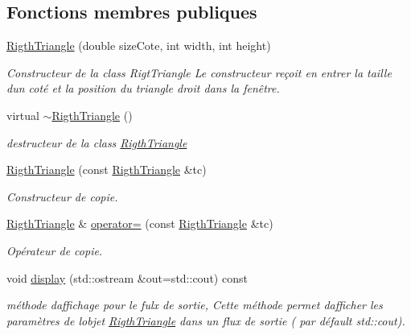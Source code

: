 \subsection*{Fonctions membres publiques}
\begin{DoxyCompactItemize}
\item 
\hyperlink{classgeometric_shape_1_1_rigth_triangle_ac705c9c12111aac3c0087164fa8d26d5}{Rigth\+Triangle} (double size\+Cote, int width, int height)
\begin{DoxyCompactList}\small\item\em Constructeur de la class Rigt\+Triangle Le constructeur reçoit en entrer la taille d\textquotesingle{}un coté et la position du triangle droit dans la fenêtre. \end{DoxyCompactList}\item 
\mbox{\label{classgeometric_shape_1_1_rigth_triangle_a3cad057825bf4f1ca6448686007c1103}} 
virtual \hyperlink{classgeometric_shape_1_1_rigth_triangle_a3cad057825bf4f1ca6448686007c1103}{$\sim$\+Rigth\+Triangle} ()
\begin{DoxyCompactList}\small\item\em destructeur de la class \hyperlink{classgeometric_shape_1_1_rigth_triangle}{Rigth\+Triangle} \end{DoxyCompactList}\item 
\hyperlink{classgeometric_shape_1_1_rigth_triangle_a35399b33888533f21db17da3e648ed99}{Rigth\+Triangle} (const \hyperlink{classgeometric_shape_1_1_rigth_triangle}{Rigth\+Triangle} \&tc)
\begin{DoxyCompactList}\small\item\em Constructeur de copie. \end{DoxyCompactList}\item 
\hyperlink{classgeometric_shape_1_1_rigth_triangle}{Rigth\+Triangle} \& \hyperlink{classgeometric_shape_1_1_rigth_triangle_a76c5aab7bfd665104047ed4717a3bc02}{operator=} (const \hyperlink{classgeometric_shape_1_1_rigth_triangle}{Rigth\+Triangle} \&tc)
\begin{DoxyCompactList}\small\item\em Opérateur de copie. \end{DoxyCompactList}\item 
void \hyperlink{classgeometric_shape_1_1_rigth_triangle_ad5d1fe984fa6fa7c6e6764b1530eeeaa}{display} (std\+::ostream \&out=std\+::cout) const
\begin{DoxyCompactList}\small\item\em méthode d\textquotesingle{}affichage pour le fulx de sortie, Cette méthode permet d\textquotesingle{}afficher les paramètres de l\textquotesingle{}objet \hyperlink{classgeometric_shape_1_1_rigth_triangle}{Rigth\+Triangle} dans un flux de sortie ( par défault std\+::cout). \end{DoxyCompactList}\end{DoxyCompactItemize}
